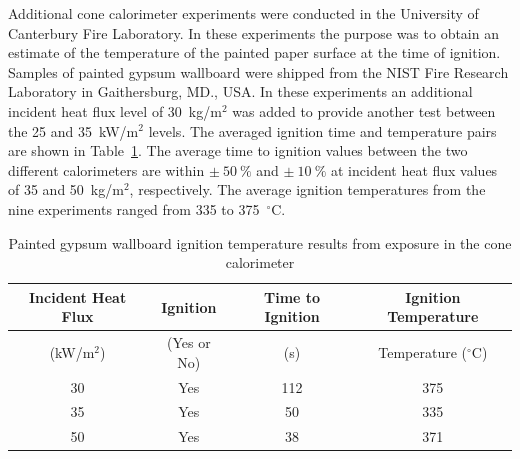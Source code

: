 \documentclass[twoside]{uocthesis}
\begin{document}
Additional cone calorimeter experiments were conducted in the University of Canterbury Fire Laboratory.  In these experiments the purpose was to obtain an estimate of the temperature of the painted paper surface at the time of ignition.   Samples of painted gypsum wallboard were shipped from the NIST Fire Research Laboratory in Gaithersburg, MD., USA.  In these experiments an additional incident heat flux level of 30~kg/m$^2$ was added to provide another test between the 25 and 35~kW/m$^2$ levels.  The averaged ignition time and temperature pairs are shown in Table~\ref{tab:Gypsum_wallboard_igntemp}.  The average time to ignition values between the two different calorimeters are within $\pm~50~\%$ and $\pm~10~\%$ at incident heat flux values of 35 and 50~kg/m$^2$, respectively.  The average ignition temperatures from the nine experiments ranged from 335 to 375~$^{\circ}$C.  
          

\begin{table}
	\centering
	\begin{tabular}{|c|c|c|c|}
		\hline Incident Heat Flux & Ignition & Time to Ignition & Ignition Temperature \\
		\hline (kW/m$^2$) & (Yes or No) & (s)  & Temperature ($^{\circ}$C)   \\
		\hline 30 	& Yes 	& 112	& 375 	 \\
		\hline 35	& Yes 	& 50 	& 335 	 \\
		\hline 50	& Yes 	& 38 	& 371 	 \\
		\hline
	\end{tabular}
	\caption[Painted gypsum wallboard ignition temperature results]{Painted gypsum wallboard ignition temperature results from exposure in the cone calorimeter}
	\label{tab:Gypsum_wallboard_igntemp}
\end{table}
\end{document}
